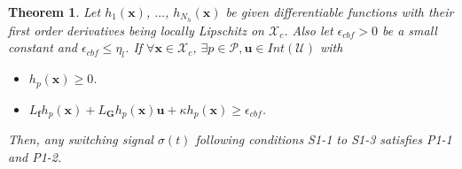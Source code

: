 \documentclass[10pt,a4paper]{amsart}
\newtheorem{theorem}{Theorem}
\begin{document}
\begin{theorem}
\label{thm:union-CBF-switching 1}
     Let $h_1(\mathbf{x})$, $\dots$, $h_{N_h}(\mathbf{x})$ be given differentiable functions with their first order derivatives being locally Lipschitz on $\mathcal{X}_c$. {Also let $\epsilon_{cbf}>0$ be a small constant and $\epsilon_{cbf}\leq \eta_l$.} If $\forall \mathbf{x}\in\mathcal{X}_c$, $\exists p\in\mathcal{P}, \mathbf{u}\in Int(\mathcal{U})$ with 
     \begin{itemize}
         \item[\textbf{C1-1}] $h_p(\mathbf{x})\geq 0$.
         \item[\textbf{C1-2}] $L_\mathbf{f}h_p(\mathbf{x}) + L_{\mathbf{G}}h_p(\mathbf{x})\mathbf{u}+\kappa h_p(\mathbf{x}) \geq \epsilon_{cbf}$.
     \end{itemize}
    Then, any switching signal $\sigma(t)$ following conditions S1-1 to S1-3 satisfies P1-1 and P1-2.
\end{theorem}
\end{document}
